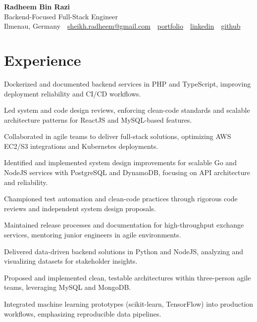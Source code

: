 \documentclass[11pt,a4paper]{resume}
\makeatletter
\newcommand{\Portfolio}{https://radheem.github.io/my-cv}
\newcommand{\PortfolioText}{portfolio}
\newcommand{\GitHub}{https://github.com/radheem}
\newcommand{\LinkedIn}{https://www.linkedin.com/in/radheem-razi}
\newcommand{\Email}{sheikh.radheem@gmail.com}
\makeatother
\begin{document}
\begin{center}
  {\huge\bfseries Radheem Bin Razi}\\[3pt]
  {\large Backend-Focused Full-Stack Engineer}\\[6pt]
  \small
  Ilmenau, Germany \,\textbar\,
  \href{mailto:\Email}{\Email} \,\textbar\,
  \href{\Portfolio}{\PortfolioText} \,\textbar\,
  \href{\LinkedIn}{linkedin} \,\textbar\,
  \href{\GitHub}{github}
\end{center}
\vspace{2pt}

\section{Experience}

\bullets
  \item Dockerized and documented backend services in PHP and TypeScript, improving deployment reliability and CI/CD workflows.
  \item Led system and code design reviews, enforcing clean-code standards and scalable architecture patterns for ReactJS and MySQL-based features.
  \item Collaborated in agile teams to deliver full-stack solutions, optimizing AWS EC2/S3 integrations and Kubernetes deployments.
\bulletsend
\vspace{3pt}
\bullets
  \item Identified and implemented system design improvements for scalable Go and NodeJS services with PostgreSQL and DynamoDB, focusing on API architecture and reliability.
  \item Championed test automation and clean-code practices through rigorous code reviews and independent system design proposals.
  \item Maintained release processes and documentation for high-throughput exchange services, mentoring junior engineers in agile environments.
\bulletsend
\vspace{3pt}
\bullets
  \item Delivered data-driven backend solutions in Python and NodeJS, analyzing and visualizing datasets for stakeholder insights.
  \item Proposed and implemented clean, testable architectures within three-person agile teams, leveraging MySQL and MongoDB.
  \item Integrated machine learning prototypes (scikit-learn, TensorFlow) into production workflows, emphasizing reproducible data pipelines.
\bulletsend
\vspace{3pt}
\end{document}
